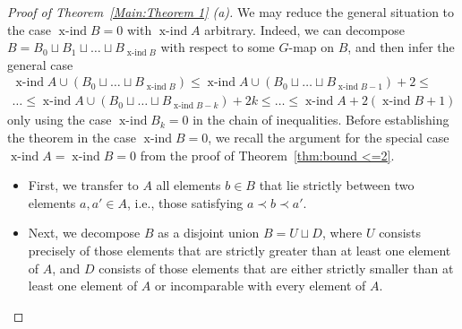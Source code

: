 \documentclass[preprint,12pt]{article}
\renewcommand{\le}{\leqslant}
\theoremstyle{definition}
\theoremstyle{remark}
\numberwithin{equation}{section}
\DeclareMathOperator{\xind}{x-ind}
\begin{document}
\begin{proof}[Proof of Theorem~\ref{Main:Theorem 1} (a)]

We may reduce the general situation to the case \(\xind B = 0\) with \(\xind A\) arbitrary. Indeed, we can decompose \(B = B_0 \sqcup B_1 \sqcup \dots \sqcup B_{\xind B}\) with respect to some \(G\)-map on \(B\), and then infer the general case 
\begin{multline*}
\xind A\cup (B_0\sqcup\dots\sqcup B_{\xind B}) \le \xind A\cup (B_0\sqcup\dots\sqcup B_{\xind B-1}) + 2 \le \\
\dots \le \xind A\cup (B_0\sqcup\dots\sqcup B_{\xind B-k}) + 2k\le
\dots \le \xind A + 2(\xind B + 1)
\end{multline*}
only using the case $\xind B_k=0$ in the chain of inequalities. Before establishing the theorem in the case \(\xind B = 0\), we recall the argument for the special case \(\xind A = \xind B = 0\) from the proof of Theorem~\ref{thm:bound <=2}.

\begin{itemize}
    \item First, we transfer to \(A\) all elements \(b \in B\) that lie strictly between two elements \(a, a' \in A\), i.e., those satisfying \(a \prec b \prec a'\).
    \item Next, we decompose \(B\) as a disjoint union \(B = U \sqcup D\), where \(U\) consists precisely of those elements that are strictly greater than at least one element of \(A\), and \(D\) consists of those elements that are either strictly smaller than at least one element of \(A\) or incomparable with every element of \(A\).
\end{itemize}


\end{proof}
\end{document}
